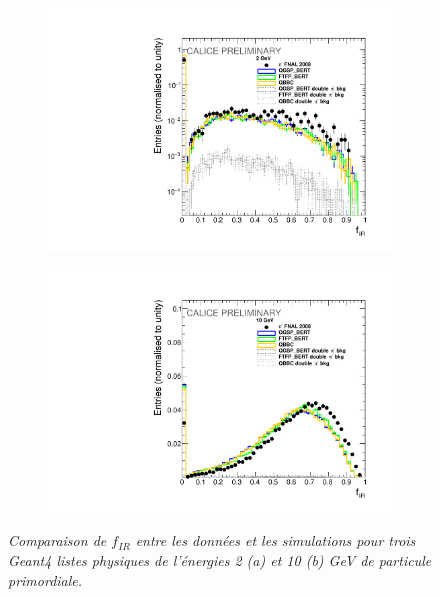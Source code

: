 \begin{figure}
	\centering
	\begin{subfigure}{0.5\textwidth}
		\centering
		\includegraphics[width=.90\linewidth]{ECAL/plots/e-ir-2.pdf}
		\caption{\label{fig:efr2F} }
	\end{subfigure}%
	\begin{subfigure}{0.5\textwidth}
		\centering
		\includegraphics[width=.90\linewidth]{ECAL/plots/e-ir-10.pdf}
		\caption{\label{fig:efr10F} }
	\end{subfigure}
	\caption{\label{fig:irexampleF} \sl%
		Comparaison de $f_{IR}$ entre les données et les simulations pour trois {\sc Geant}4  listes physiques de l'\'energies 2 (a) et 10 (b) GeV de particule primordiale.}
\end{figure}

